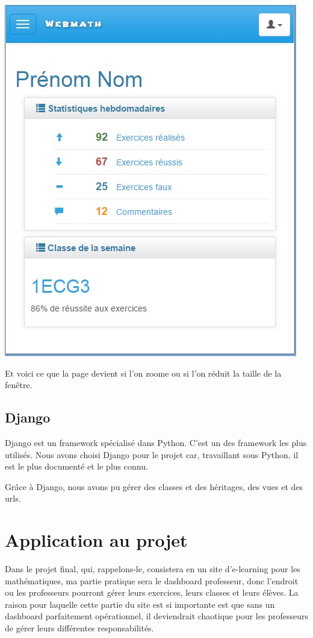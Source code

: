 \documentclass[letterpaper,10pt,french]{sphinxmanual}
\begin{document}
\includegraphics{smallscreen.png}

Et voici ce que la page devient si l'on zoome ou si l'on réduit la taille de la
fenêtre.


\subsection{Django}
\label{documentation:django}
Django est un framework spécialisé dans Python. C'est un des framework les plus
utilisés. Nous avons choisi Django pour le projet car, travaillant sous Python,
il est le plus documenté et le plus connu.

Grâce à Django, nous avons pu gérer des classes et des héritages, des vues et
des urls.


\section{Application au projet}
\label{documentation:application-au-projet}
Dans le projet final, qui, rappelons-le, consistera en un site d'e-learning pour
les mathématiques, ma partie pratique sera le dashboard professeur, donc
l'endroit ou les professeurs pourront gérer leurs exercices, leurs classes et
leurs élèves. La raison pour laquelle cette partie du site est si importante
est que sans un dashboard parfaitement opérationnel, il deviendrait chaotique
pour les professeurs de gérer leurs différentes responsabilités.
\end{document}
